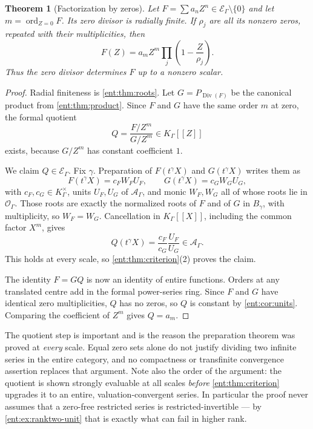 \documentclass[11pt]{article}
\newtheorem{theorem}{Theorem}[section]
\theoremstyle{plain}
\theoremstyle{plain}
\theoremstyle{plain}
\theoremstyle{definition}
\theoremstyle{definition}
\theoremstyle{definition}
\theoremstyle{definition}
\theoremstyle{remark}
\newcommand{\K}{K_\Gamma}\newcommand{\KD}{K_\Delta}
\newcommand{\E}{\mathcal E_\Gamma}
\newcommand{\A}{\mathcal A_\Gamma}\newcommand{\OO}{\mathcal O_\Gamma}
\DeclareMathOperator{\ord}{ord}\DeclareMathOperator{\cf}{cf}
\DeclareMathOperator{\Div}{Div}\DeclareMathOperator{\inpol}{in}
\begin{document}
\begin{theorem}[Factorization by zeros]\label{ent:thm:factorization}
Let $F=\sum a_nZ^n\in\E\setminus\{0\}$ and let $m=\ord_{Z=0}F$. Its zero
divisor is radially finite. If $\rho_j$ are all its nonzero zeros, repeated
with their multiplicities, then
\begin{equation}\label{ent:eq:factorization}
 F(Z)=a_mZ^m\prod_j\left(1-\frac Z{\rho_j}\right).
\end{equation}
Thus the zero divisor determines $F$ up to a nonzero scalar.
\end{theorem}
\begin{proof}
Radial finiteness is \cref{ent:thm:roots}. Let $G=P_{\Div(F)}$ be the
canonical product from \cref{ent:thm:product}. Since $F$ and $G$ have the
same order $m$ at zero, the formal quotient
\[
 Q=\frac{F/Z^m}{G/Z^m}\in\K[[Z]]
\]
exists, because $G/Z^m$ has constant coefficient $1$.

We claim $Q\in\E$. Fix $\gamma$. Preparation of $F(t^\gamma X)$ and
$G(t^\gamma X)$ writes them as
\[
 F(t^\gamma X)=c_F W_F U_F,\qquad
 G(t^\gamma X)=c_G W_G U_G,
\]
with $c_F,c_G\in\K^\times$, units $U_F,U_G$ of $\A$, and monic $W_F,W_G$ all
of whose roots lie in $\OO$. Those roots are exactly the normalized roots of
$F$ and of $G$ in $B_\gamma$, with multiplicity, so $W_F=W_G$. Cancellation
in $\K[[X]]$, including the common factor $X^m$, gives
\[
 Q(t^\gamma X)=\frac{c_F}{c_G}\frac{U_F}{U_G}\in\A.
\]
This holds at every scale, so \cref{ent:thm:criterion}(2) proves the claim.

The identity $F=GQ$ is now an identity of entire functions. Orders at any
translated centre add in the formal power-series ring. Since $F$ and $G$ have
identical zero multiplicities, $Q$ has no zeros, so $Q$ is constant by
\cref{ent:cor:units}. Comparing the coefficient of $Z^m$ gives $Q=a_m$.
\end{proof}

The quotient step is important and is the reason the preparation theorem was
proved at \emph{every} scale. Equal zero sets alone do not justify dividing
two infinite series in the entire category, and no compactness or transfinite
convergence assertion replaces that argument. Note also the order of the
argument: the quotient is shown strongly evaluable at all scales
\emph{before} \cref{ent:thm:criterion} upgrades it to an entire,
valuation-convergent series. In particular the proof never assumes that a
zero-free restricted series is restricted-invertible --- by
\cref{ent:ex:ranktwo-unit} that is exactly what can fail in higher rank.
\end{document}
